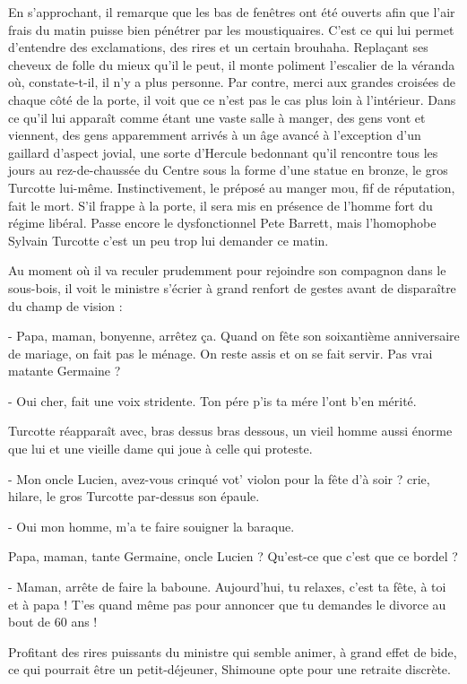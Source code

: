 En s’approchant, il remarque que les bas de fenêtres ont été ouverts afin que l’air frais du matin puisse bien pénétrer par les moustiquaires. C’est ce qui lui permet d’entendre des exclamations, des rires et un certain brouhaha. Replaçant ses cheveux de folle du mieux qu’il le peut, il monte poliment l’escalier de la véranda où, constate-t-il, il n’y a plus personne. Par contre, merci aux grandes croisées de chaque côté de la porte, il voit que ce n’est pas le cas plus loin à l’intérieur. Dans ce qu’il lui apparaît comme étant une vaste salle à manger, des gens vont et viennent, des gens apparemment arrivés à un âge avancé à l’exception d’un gaillard d’aspect jovial, une sorte d’Hercule bedonnant qu’il rencontre tous les jours au rez-de-chaussée du Centre sous la forme d’une statue en bronze, le gros Turcotte lui-même. Instinctivement, le préposé au manger mou, fif de réputation, fait le mort. S’il frappe à la porte, il sera mis en présence de l’homme fort du régime libéral. Passe encore le dysfonctionnel Pete Barrett, mais l’homophobe Sylvain Turcotte c’est un peu trop lui demander ce matin.

Au moment où il va reculer prudemment pour rejoindre son compagnon dans le sous-bois, il voit le ministre s’écrier à grand renfort de gestes avant de disparaître du champ de vision :

- Papa, maman, bonyenne, arrêtez ça. Quand on fête son soixantième anniversaire de mariage, on fait pas le ménage. On reste assis et on se fait servir. Pas vrai matante Germaine ?

- Oui cher, fait une voix stridente. Ton pére p’is ta mére l’ont b’en mérité.

Turcotte réapparaît avec, bras dessus bras dessous, un vieil homme aussi énorme que lui et une vieille dame qui joue à celle qui proteste.

- Mon oncle Lucien, avez-vous crinqué vot’ violon pour la fête d’à soir ? crie, hilare, le gros Turcotte par-dessus son épaule.

- Oui mon homme, m’a te faire souigner la baraque.

Papa, maman, tante Germaine, oncle Lucien ? Qu’est-ce que c’est que ce bordel ?

- Maman, arrête de faire la baboune. Aujourd’hui, tu relaxes, c’est ta fête, à toi et à papa ! T’es quand même pas pour annoncer que tu demandes le divorce au bout de 60 ans !

Profitant des rires puissants du ministre qui semble animer, à grand effet de bide, ce qui pourrait être un petit-déjeuner, Shimoune opte pour une retraite discrète.

